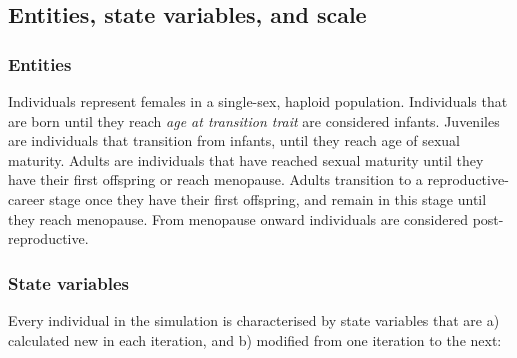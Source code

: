 \documentclass{article}
\begin{document}
\subsection{Entities, state variables, and scale}

\subsubsection{Entities}

Individuals represent females in a single-sex, haploid population. Individuals that are born until they reach \emph{age at transition trait} are considered infants. Juveniles are individuals that transition from infants, until they reach age of sexual maturity. Adults are individuals that have reached sexual maturity until they have their first offspring or reach menopause. Adults transition to a reproductive-career stage once they have their first offspring, and remain in this stage until they reach menopause. From menopause onward individuals are considered post-reproductive.

\subsubsection{State variables}

Every individual in the simulation is characterised by state variables that are a) calculated new in each iteration, and b) modified from one iteration to the next:
\end{document}
